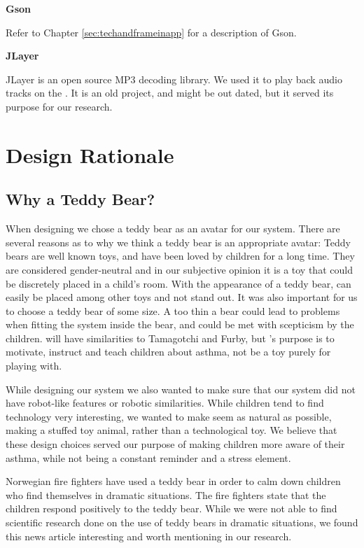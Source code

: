 \textbf{Gson}

Refer to Chapter \ref{sec:techandframeinapp} for a description of Gson.    

\textbf{JLayer}

JLayer is an open source MP3 decoding library. We used it to play back audio tracks on the \rpi{}. It is an old project, and might be out dated, but it served its purpose for our research.  
 

\section{Design Rationale}
\label{sec:designrationale}
\subsection{Why a Teddy Bear?}
When designing \buddy{} we chose a teddy bear as an avatar for our system. There are several reasons as to why we think a teddy bear is an appropriate avatar: Teddy bears are well known toys, and have been loved by children for a long time. They are considered gender-neutral\cite{stagnitti1997determining}\cite{cherney2006gender} and in our subjective opinion it is a toy that could be discretely placed in a child's room. With the appearance of a teddy bear, \buddy{} can easily be placed among other toys and not stand out. It was also important for us to choose a teddy bear of some size. A too thin a bear could lead to problems when fitting the system inside the bear, and could be met with scepticism by the children. \buddy{} will have similarities to Tamagotchi\cite{tamagotchi} and Furby\cite{furby}, but \buddy{}'s purpose is to motivate, instruct and teach children about asthma, not be a toy purely for playing with. 

While designing our system we also wanted to make sure that our system did not have robot-like features or robotic similarities. While children tend to find technology very interesting, we wanted to make \buddy{} seem as natural as possible, making a stuffed toy animal, rather than a technological toy. We believe that these design choices served our purpose of making children more aware of their asthma, while not being a constant reminder and a stress element. 

Norwegian fire fighters have used a teddy bear in order to calm down children who find themselves in dramatic situations. The fire fighters state that the children respond positively to the teddy bear. 
While we were not able to find scientific research done on the use of teddy bears in dramatic situations, we found this news article interesting and worth mentioning in our research. 

